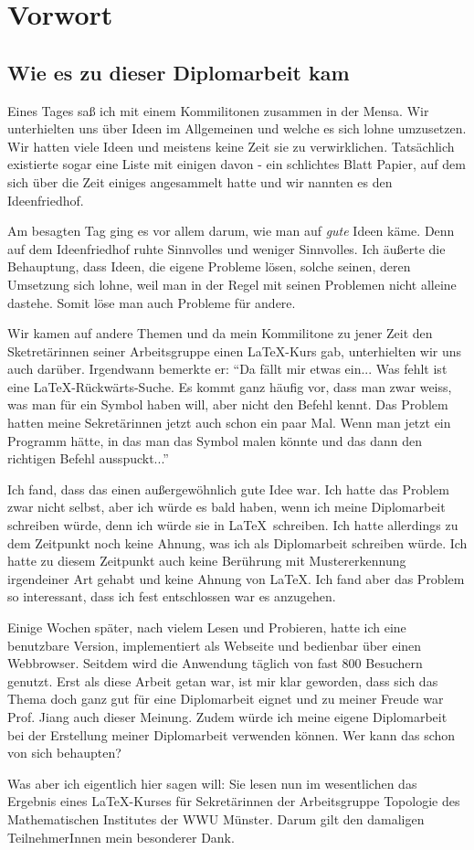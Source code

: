 \chapter{Vorwort}

\section*{Wie es zu dieser Diplomarbeit kam}

Eines Tages saß ich mit einem Kommilitonen zusammen in der Mensa. Wir unterhielten uns über Ideen im Allgemeinen und welche es sich lohne umzusetzen. Wir hatten viele Ideen und meistens keine Zeit sie zu verwirklichen. Tatsächlich existierte sogar eine Liste mit einigen davon - ein schlichtes Blatt Papier, auf dem sich über die Zeit einiges angesammelt hatte und wir nannten es den Ideenfriedhof.

Am besagten Tag ging es vor allem darum, wie man auf {\em gute} Ideen käme. Denn auf dem Ideenfriedhof ruhte Sinnvolles und weniger Sinnvolles. Ich äußerte die Behauptung, dass Ideen, die eigene Probleme lösen, solche seinen, deren Umsetzung sich lohne, weil man in der Regel mit seinen Problemen nicht alleine dastehe. Somit löse man auch Probleme für andere.

Wir kamen auf andere Themen und da mein Kommilitone zu jener Zeit den Sketretärinnen seiner Arbeitsgruppe einen \LaTeX-Kurs gab, unterhielten wir uns auch darüber. Irgendwann bemerkte er: "`Da fällt mir etwas ein... Was fehlt ist eine LaTeX-Rückwärts-Suche. Es kommt ganz häufig vor, dass man zwar weiss, was man für ein Symbol haben will, aber nicht den Befehl kennt. Das Problem hatten meine Sekretärinnen jetzt auch schon ein paar Mal. Wenn man jetzt ein Programm hätte, in das man das Symbol malen könnte und das dann den richtigen Befehl ausspuckt..."'

Ich fand, dass das einen außergewöhnlich gute Idee war. Ich hatte das Problem zwar nicht selbst, aber ich würde es bald haben, wenn ich meine Diplomarbeit schreiben würde, denn ich würde sie in \LaTeX\ schreiben. Ich hatte allerdings zu dem Zeitpunkt noch keine Ahnung, was ich als Diplomarbeit schreiben würde. Ich hatte zu diesem Zeitpunkt auch keine Berührung mit Mustererkennung irgendeiner Art gehabt und keine Ahnung von \LaTeX. Ich fand aber das Problem so interessant, dass ich fest entschlossen war es anzugehen.

Einige Wochen später, nach vielem Lesen und Probieren, hatte ich eine benutzbare Version, implementiert als Webseite und bedienbar über einen Webbrowser. Seitdem wird die Anwendung täglich von fast 800 Besuchern genutzt. Erst als diese Arbeit getan war, ist mir klar geworden, dass sich das Thema doch ganz gut für eine Diplomarbeit eignet und zu meiner Freude war Prof. Jiang auch dieser Meinung. Zudem würde ich meine eigene Diplomarbeit bei der Erstellung meiner Diplomarbeit verwenden können. Wer kann das schon von sich behaupten?

Was aber ich eigentlich hier sagen will: Sie lesen nun im wesentlichen das Ergebnis eines \LaTeX-Kurses für Sekretärinnen der Arbeitsgruppe Topologie des Mathematischen Institutes der WWU Münster. Darum gilt den damaligen TeilnehmerInnen mein besonderer Dank.